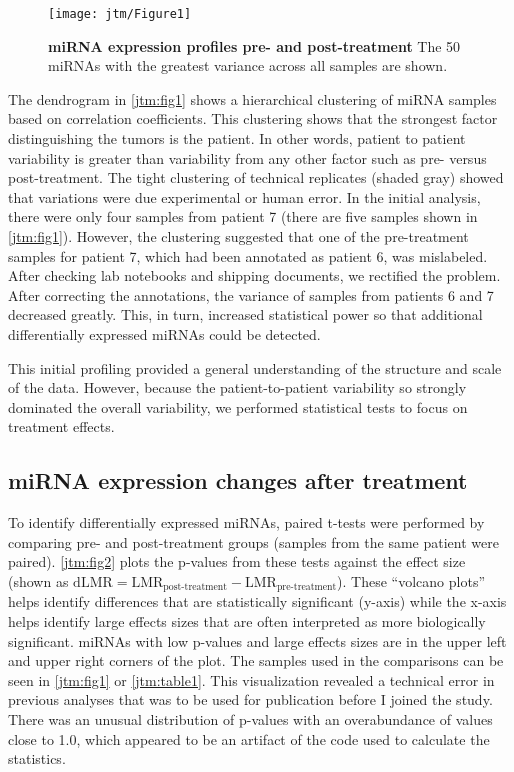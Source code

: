 \begin{figure}
  \centering
  \texttt{[image: jtm/Figure1]}
  \caption[miRNA expression profiles pre- and post-treatment]{
       \textbf{miRNA expression profiles pre- and post-treatment}
       The 50 miRNAs with the greatest variance across all samples are shown.
  }
  \label{jtm:fig1}
\end{figure}

The dendrogram in \autoref{jtm:fig1} shows a hierarchical
clustering of miRNA samples based on correlation coefficients. 
This clustering shows that the strongest
factor distinguishing the tumors is the patient. In other words, patient to patient
variability is greater than variability from any other factor such as pre- versus post-treatment.
The tight clustering of technical replicates (shaded gray) showed that variations
were due experimental or human error.
In the initial analysis, there were only four 
samples from patient 7 (there are five samples
shown in \autoref{jtm:fig1}). However, the clustering suggested
 that one of the pre-treatment samples for patient
7, which had been annotated as patient 6, was mislabeled. After checking lab notebooks
and shipping documents, we rectified the problem. After correcting
the annotations, the variance of samples from patients 6 and 7 decreased greatly.
This, in turn, increased statistical power so that additional differentially expressed miRNAs could
be detected.

This initial profiling provided a general understanding of the structure and scale
of the data. However, because the patient-to-patient variability so strongly
dominated the overall variability, we performed statistical tests to focus
on treatment effects.

\subsection{miRNA expression changes after treatment}

To identify differentially expressed miRNAs, paired t-tests were
performed by comparing pre- and post-treatment groups (samples from
the same patient were paired). \autoref{jtm:fig2} plots the p-values
from these tests against the effect size (shown as $\text{dLMR} =
\text{LMR}_{\text{post-treatment}} - \text{LMR}_{\text{pre-treatment}}$).
These ``volcano plots'' helps identify differences that are statistically
significant (y-axis) while the x-axis helps identify large effects sizes
that are often interpreted as more biologically significant. miRNAs with
low p-values and large effects sizes are in the upper left and upper right
corners of the plot. The samples used in the comparisons can be
seen in \autoref{jtm:fig1} or \autoref{jtm:table1}. This visualization revealed
a technical error in previous analyses that was to be used for publication before
I joined the study. There was an unusual distribution of p-values with
an overabundance of values close to 1.0, which appeared to be an artifact of the code used
to calculate the statistics.


